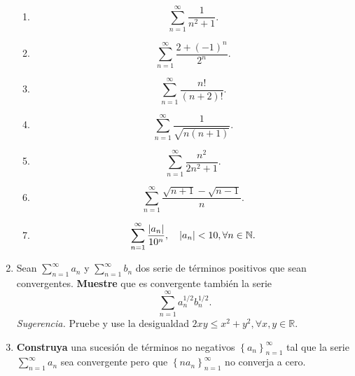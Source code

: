 \documentclass[12pt]{article}
\begin{document}
\begin{enumerate}
    \begin{multicols}{2}
        \begin{enumerate}
            \item \begin{equation*}
                \sum_{n=1}^{\infty}\frac{1}{n^2+1}.
            \end{equation*}
            \item \begin{equation*}
                \sum_{n=1}^{\infty}\frac{2+(-1)^n}{2^n}.
            \end{equation*}
            \item \begin{equation*}
                \sum_{n=1}^{\infty}\frac{n!}{(n+2)!}.
            \end{equation*}
            \item \begin{equation*}
                \sum_{n=1}^{\infty}\frac{1}{\sqrt{n(n+1)}}.
            \end{equation*}
            \item \begin{equation*}
                \sum_{n=1}^{\infty}\frac{n^2}{2n^2+1}.
            \end{equation*}
            \item \begin{equation*}
                \sum_{n=1}^{\infty}\frac{\sqrt{n+1}-\sqrt{n-1}}{n}.
            \end{equation*}
            \item \begin{equation*}
                \sum_{n=1}^{\infty}\frac{\left| a_n \right|}{10^n}, \quad \left| a_n \right|<10,\forall n\in\mathbb{N}.
            \end{equation*}
        \end{enumerate}
    \end{multicols}
    \item Sean $\sum_{n=1}^{\infty}a_n$ y $\sum_{n=1}^{\infty}b_n$ dos serie de términos positivos que sean convergentes. \textbf{Muestre} que es convergente también la serie
    \begin{equation*}
        \sum_{n=1}^{\infty}a_n^{1/2}b_n^{1/2}.
    \end{equation*}
    \textit{Sugerencia.} Pruebe y use la desigualdad $2xy\leq x^2+y^2,\forall x,y\in\mathbb{R}$.
    \item \textbf{Construya} una sucesión de términos no negativos $\left\{a_n\right\}_{n=1}^{\infty}$ tal que la serie $\sum_{n=1}^{\infty}a_n$ sea convergente pero que $\left\{na_n\right\}_{n=1}^{\infty}$ no converja a cero.

\end{enumerate}
\end{document}
